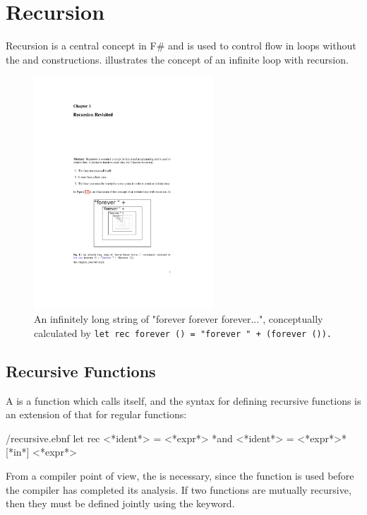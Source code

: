 \chapter{Recursion}
\label{sec:recursion}
Recursion is a central concept in F\# and is used to control flow in loops without the  and  constructions.  illustrates the concept of an infinite loop with recursion. 
\begin{figure} %
  \centering
  \includegraphics[width=0.6\textwidth]{recursion}
  \caption{An infinitely long string of "forever forever forever...", conceptually calculated by \mbox{\lstinline{let rec forever () = "forever " + (forever ()).}}}
  \label{fig:foreverRecursion}
\end{figure}

\section{Recursive Functions}
A  is a function which calls itself, and the syntax for defining recursive functions is an extension of that for regular functions:
%
\begin{verbatimwrite}{\ebnf/recursive.ebnf}
let rec <*ident*> = <*expr*> {*and <*ident*> = <*expr*>*} [*in*] <*expr*>
\end{verbatimwrite}
%
From a compiler point of view, the  is necessary, since the function is used before the compiler has completed its analysis. If two functions are mutually recursive, then they must be defined jointly using the  keyword.

